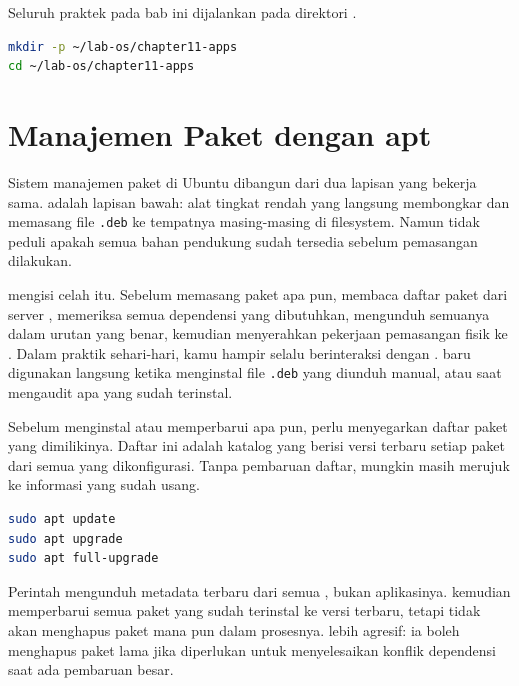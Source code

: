 \begin{notebox}
Seluruh praktek pada bab ini dijalankan pada direktori .
\begin{lstlisting}[language=bash]
mkdir -p ~/lab-os/chapter11-apps
cd ~/lab-os/chapter11-apps
\end{lstlisting}
\end{notebox}

\section{Manajemen Paket dengan apt}
\label{sec:apt-package-management}

Sistem manajemen paket di Ubuntu dibangun dari dua lapisan yang bekerja sama.
 adalah lapisan bawah: alat tingkat rendah yang langsung membongkar
dan memasang file \texttt{.deb} ke tempatnya masing-masing di filesystem. Namun
 tidak peduli apakah semua bahan pendukung sudah tersedia sebelum
pemasangan dilakukan.

 mengisi celah itu. Sebelum memasang paket apa pun, 
membaca daftar paket dari server , memeriksa semua dependensi yang
dibutuhkan, mengunduh semuanya dalam urutan yang benar, kemudian menyerahkan
pekerjaan pemasangan fisik ke . Dalam praktik sehari-hari, kamu
hampir selalu berinteraksi dengan .  baru digunakan
langsung ketika menginstal file \texttt{.deb} yang diunduh manual, atau
saat mengaudit apa yang sudah terinstal.

Sebelum menginstal atau memperbarui apa pun,  perlu menyegarkan
daftar paket yang dimilikinya. Daftar ini adalah katalog yang berisi versi
terbaru setiap paket dari semua  yang dikonfigurasi. Tanpa pembaruan
daftar,  mungkin masih merujuk ke informasi yang sudah usang.

\begin{lstlisting}[language=bash, caption={Memperbarui daftar paket dan sistem}]
sudo apt update
sudo apt upgrade
sudo apt full-upgrade
\end{lstlisting}

Perintah  mengunduh metadata terbaru dari semua ,
bukan aplikasinya.  kemudian memperbarui semua paket yang
sudah terinstal ke versi terbaru, tetapi tidak akan menghapus paket mana pun
dalam prosesnya.  lebih agresif: ia boleh menghapus
paket lama jika diperlukan untuk menyelesaikan konflik dependensi saat ada
pembaruan besar.

